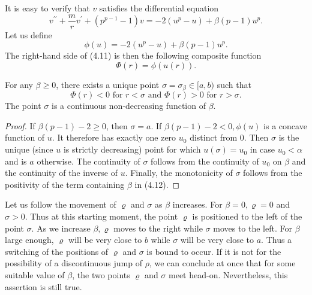 It is easy to verify that $v$ satisfies the differential equation
\begin{equation}\label{eq:4.11}
  v^{\prime \prime}+\frac{m}{r} v^{\prime}+\left(p^{p-1}-1\right) v 
    = -2\left(u^p-u\right)+\beta(p-1) u^p.
\end{equation}
Let us define
\begin{equation}\label{eq:4.12}
  \phi(u)=-2\left(u^p-u\right)+\beta(p-1) u^p .  
\end{equation}
The right-hand side of (4.11) is then the following composite function
\[\Phi(r)=\phi(u(r)).\]

\begin{lemma}\label{lemma:22}
  For any $\beta \geq 0$, there exists a unique point $\sigma=\sigma_\beta \in[a, b)$
  such that
  \begin{equation}\label{eq:4.13}
    \Phi(r)<0 \text { for } r<\sigma \text { and } \Phi(r)>0 \text { for } r>\sigma.  
  \end{equation}
  The point $\sigma$ is a continuous non-decreasing function of $\beta$.
\end{lemma}

\begin{proof}
  If $\beta(p-1)-2 \geq 0$, then $\sigma=a$. If $\beta(p-1)-2<0, \phi(u)$
  is a concave function of $u$. It therefore has exactly one zero $u_0$ distinct from 0.
  Then $\sigma$ is the unique (since $u$ is strictly decreasing) point 
  for which $u(\sigma)=u_0$ in case $u_0<\alpha$ and is $a$ otherwise.
  The continuity of $\sigma$ follows from the continuity of $u_0$ on $\beta$
  and the continuity of the inverse of $u$. Finally, the monotonicity of $\sigma$
  follows from the positivity of the term containing $\beta$ in (4.12).
\end{proof}

Let us follow the movement of $\varrho$ and $\sigma$ as $\beta$ increases.
For $\beta=0, \varrho=0$ and $\sigma>0$. Thus at this starting moment,
the point $\varrho$ is positioned to the left of the point $\sigma$.
As we increase $\beta, \varrho$ moves to the right while $\sigma$ moves to the left.
For $\beta$ large enough, $\varrho$ will be very close to $b$ while $\sigma$
will be very close to $a$. Thus a switching of the positions of $\varrho$ and $\sigma$
is bound to occur. If it is not for the possibility of a discontinuous jump of $\rho$,
we can conclude at once that for some suitable value of $\beta$,
the two points $\varrho$ and $\sigma$ meet head-on. Nevertheless,
this assertion is still true.

